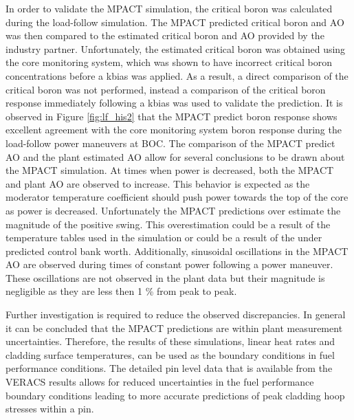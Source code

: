 \documentclass[edeposit,fullpage,11pt]{uiucthesis2009}
\begin{document}
In order to validate the MPACT simulation, the critical boron was calculated during the load-follow simulation. 
The MPACT predicted critical boron and \gls{AO} was then compared to the estimated critical boron and \gls{AO} provided by the industry partner.
Unfortunately, the estimated critical boron was obtained using the core monitoring system, which was shown to have incorrect critical boron concentrations before a kbias was applied. 
As a result, a direct comparison of the critical boron was not performed, instead a comparison of the critical boron response immediately following a kbias was used to validate the prediction.
It is observed in Figure \ref{fig:lf_his2} that the MPACT predict boron response shows excellent agreement with the core monitoring system boron response during the load-follow power maneuvers at \gls{BOC}.
The comparison of the MPACT predict \gls{AO} and the plant estimated \gls{AO} allow for several conclusions to be drawn about the MPACT simulation.
At times when power is decreased, both the MPACT and plant \gls{AO} are observed to increase.
This behavior is expected as the moderator temperature coefficient should push power towards the top of the core as power is decreased.
Unfortunately the MPACT predictions over estimate the magnitude of the positive swing.
This overestimation could be a result of the temperature tables used in the simulation or could be a result of the under predicted control bank worth.
Additionally, sinusoidal oscillations in the MPACT \gls{AO} are observed during times of constant power following a power maneuver.
These oscillations are not observed in the plant data but their magnitude is negligible as they are less then 1 \% from peak to peak.
  
Further investigation is required to reduce the observed discrepancies.
In general it can be concluded that the MPACT predictions are within plant measurement uncertainties.
Therefore, the results of these simulations, linear heat rates and cladding surface temperatures, can be used as the boundary conditions in fuel performance conditions.
The detailed pin level data that is available from the \gls{VERACS} results allows for reduced uncertainties in the fuel performance boundary conditions leading to more accurate predictions of peak cladding hoop stresses within a pin.

\end{document}
